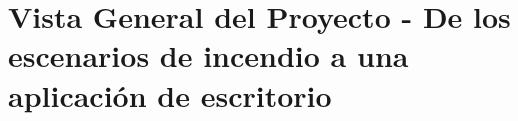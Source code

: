 \clearpage
\section{Vista General del Proyecto - De los escenarios de incendio a una aplicación de escritorio}\label{sec:spmp-6}






